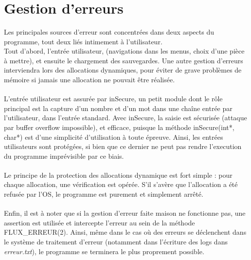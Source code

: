 \documentclass{report}
\begin{document}
    \section*{Gestion d'erreurs} %
        \paragraph*{}
        Les principales sources d'erreur sont concentrées dans deux aspects du programme, tout deux liés intimement à l'utilisateur.\\
        Tout d'abord, l'entrée utilisateur, (navigations dans les menus, choix d'une pièce à mettre), et ensuite le chargement des sauvegardes.
        Une autre gestion d'erreurs interviendra lors des allocations dynamiques, pour éviter de grave problèmes de mémoire si jamais une allocation ne pouvait être réalisée.

        \paragraph*{} %
        L'entrée utilisateur est assurée par inSecure, un petit module dont le rôle principal est la capture d'un nombre et d'un mot dans une chaîne entrée par l'utilisateur, 
            dans l'entrée standard.
        Avec inSecure, la saisie est sécurisée (attaque par buffer overflow impossible), et efficace, puisque la méthode inSecure(int*, char*) est d'une simplicité d'utilisation
            à toute épreuve.
        Ainsi, les entrées utilisateurs sont protégées, si bien que ce dernier ne peut pas rendre l'execution du programme imprévisible par ce biais.

        \paragraph*{} %

        \paragraph*{} %
        Le principe de la protection des allocations dynamique est fort simple : pour chaque allocation, une vérification est opérée. S'il s'avère que l'allocation a été refusée par l'OS,
        le programme est purement et simplement arrêté.

        \paragraph*{} %
        Enfin, il est à noter que si la gestion d'erreur faite maison ne fonctionne pas, une assertion est utilisée et intercepte l'erreur au sein de la méthode FLUX\_ERREUR(2).
        Ainsi, même dans le cas où des erreurs se déclenchent dans le système de traitement d'erreur (notamment dans l'écriture des logs dans \textit{erreur.txt}), 
            le programme se terminera le plus proprement possible.
\end{document}
